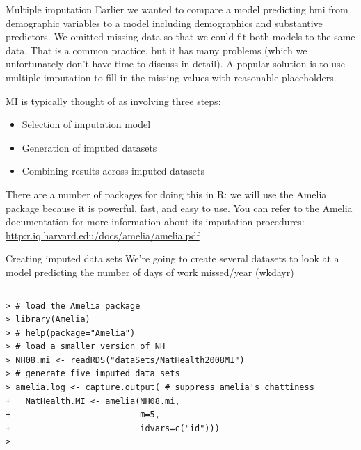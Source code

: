 \documentclass[table,smaller]{beamer}
\begin{document}
\begin{frame}[label=sec-6-2]{Multiple imputation}
Earlier we wanted to compare a model predicting bmi from demographic variables to a model including demographics and substantive predictors. We omitted missing data so that we could fit both models to the same data. That is a common practice, but it has many problems (which we unfortunately don't have time to discuss in detail). A popular solution is to use multiple imputation to fill in the missing values with reasonable placeholders. 

MI is typically thought of as involving three steps:
\begin{itemize}
\item Selection of imputation model
\item Generation of imputed datasets
\item Combining results across imputed datasets
\end{itemize}

There are a number of packages for doing this in R: we will use the Amelia package because it is powerful, fast, and easy to use. You can refer to the Amelia documentation for more information about its imputation procedures:
\url{http:r.iq.harvard.edu/docs/amelia/amelia.pdf}
\end{frame}


\begin{frame}[fragile,label=sec-6-3]{Creating imputed data sets}
 We're going to create several datasets to look at a model predicting the number of days of work missed/year (wkdayr)

\vspace{-.5em}
\begin{columns}
\begin{block}{}
\begin{verbatim}
> # load the Amelia package
> library(Amelia)
> # help(package="Amelia")
> # load a smaller version of NH
> NH08.mi <- readRDS("dataSets/NatHealth2008MI")
> # generate five imputed data sets
> amelia.log <- capture.output( # suppress amelia's chattiness
+   NatHealth.MI <- amelia(NH08.mi,
+                          m=5,
+                          idvars=c("id")))
>
\end{verbatim}
\end{block}
\end{columns}
\vspace{.5em}
\end{frame}
\end{document}
